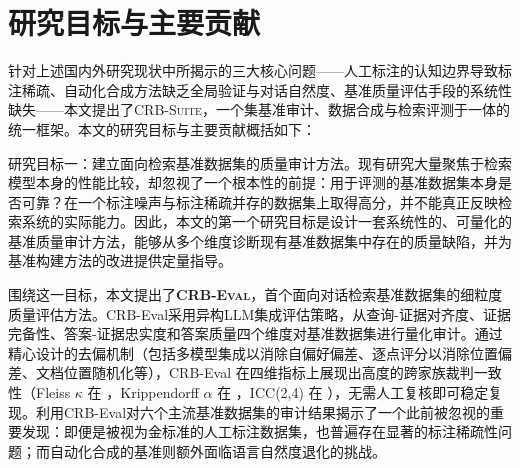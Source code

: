 

\section{研究目标与主要贡献}

针对上述国内外研究现状中所揭示的三大核心问题——人工标注的认知边界导致标注稀疏、自动化合成方法缺乏全局验证与对话自然度、基准质量评估手段的系统性缺失——本文提出了\textsc{CRB-Suite}，一个集基准审计、数据合成与检索评测于一体的统一框架。本文的研究目标与主要贡献概括如下：

研究目标一：建立面向检索基准数据集的质量审计方法。现有研究大量聚焦于检索模型本身的性能比较，却忽视了一个根本性的前提：用于评测的基准数据集本身是否可靠？在一个标注噪声与标注稀疏并存的数据集上取得高分，并不能真正反映检索系统的实际能力。因此，本文的第一个研究目标是设计一套系统性的、可量化的基准质量审计方法，能够从多个维度诊断现有基准数据集中存在的质量缺陷，并为基准构建方法的改进提供定量指导。

围绕这一目标，本文提出了\textbf{\textsc{CRB-Eval}}，首个面向对话检索基准数据集的细粒度质量评估方法。CRB-Eval采用异构LLM集成评估策略，从查询-证据对齐度、证据完备性、答案-证据忠实度和答案质量四个维度对基准数据集进行量化审计。通过精心设计的去偏机制（包括多模型集成以消除自偏好偏差、逐点评分以消除位置偏差、文档位置随机化等），CRB-Eval 在四维指标上展现出高度的跨家族裁判一致性（Fleiss $\kappa$ 在 ，Krippendorff $\alpha$ 在 ，ICC(2,4) 在 ），无需人工复核即可稳定复现。利用CRB-Eval对六个主流基准数据集的审计结果揭示了一个此前被忽视的重要发现：即便是被视为金标准的人工标注数据集，也普遍存在显著的标注稀疏性问题；而自动化合成的基准则额外面临语言自然度退化的挑战。

